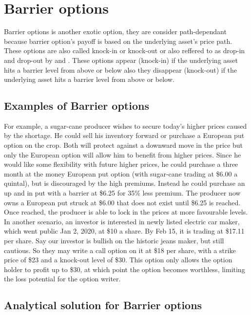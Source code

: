 \documentclass{article}
\begin{document}
\section{Barrier options
}
Barrier options is another exotic option, they are consider path-dependant because barrier option's payoff is based on the underlying asset's price path.  These options are also called knock-in or knock-out or also reffered to as drop-in and drop-out by \cite{Rub2} and \cite{Rub4}. These options appear  (knock-in) if the underlying asset hits a barrier level from above or below also they disappear (knock-out) if the underlying asset hits a barrier level from above or below.\\
\subsection{Examples of Barrier options
}

For example, a sugar-cane producer wishes to secure today’s higher prices caused by the shortage. He could sell his inventory forward or purchase a European put option on the crop. Both will protect against a downward move in the price but only the European option will allow him to benefit from higher prices. Since he would like some flexibility with future higher prices, he could purchase a three month at the money European put option (with sugar-cane trading at \$6.00 a quintal), but is discouraged by the high premiums. Instead he could purchase an up and in put with a barrier at \$6.25 for 35\% less premium. The producer now owns a European put struck at \$6.00 that does not exist until \$6.25 is reached. Once reached, the producer is able to lock in the prices at more favourable levels.\\

In another scenario, an investor is interested in newly listed electric car maker, which went public Jan 2, 2020, at \$10 a share. By Feb 15, it is trading at \$17.11 per share. Say our investor is bullish on the historic jeans maker, but still cautious.  So they may write a call option on it at \$18 per share, with a strike price of \$23 and a knock-out level of \$30. This option only allows the option holder to profit up to \$30, at which point the option becomes worthless, limiting the loss potential for the option writer.\\

\subsection{Analytical solution for Barrier options
}
\end{document}

